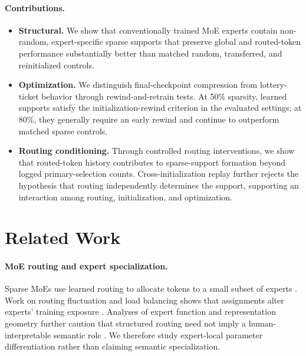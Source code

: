 \documentclass{article}
\begin{document}
\paragraph{Contributions.}
\begin{itemize}[leftmargin=*]
  \item \textbf{Structural.} We show that conventionally trained MoE experts
  contain non-random, expert-specific sparse supports that preserve global and
  routed-token performance substantially better than matched random,
  transferred, and reinitialized controls.

  \item \textbf{Optimization.} We distinguish final-checkpoint compression
  from lottery-ticket behavior through rewind-and-retrain tests. At 50\%
  sparsity, learned supports satisfy the initialization-rewind criterion in the
  evaluated settings; at 80\%, they generally require an early rewind and
  continue to outperform matched sparse controls.

  \item \textbf{Routing conditioning.} Through controlled routing
  interventions, we show that routed-token history contributes to
  sparse-support formation beyond logged primary-selection counts.
  Cross-initialization
  replay further rejects the hypothesis that routing independently determines
  the support, supporting an interaction among routing, initialization, and
  optimization.
\end{itemize}

\section{Related Work}
\label{sec:related_work}

\paragraph{MoE routing and expert specialization.}
Sparse MoEs use learned routing to allocate tokens to a small subset of experts
\citep{shazeer2017outrageouslylargeneuralnetworks,
lepikhin2020gshardscalinggiantmodels,
fedus2022switchtransformersscalingtrillion}. Work on routing fluctuation and
load balancing shows that assignments alter experts' training exposure
\citep{dai-etal-2022-stablemoe,
guo2026advancingexpertspecializationbetter}. Analyses of expert function and
representation geometry further caution that structured routing need not imply
a human-interpretable semantic role
\citep{lo2025closer,wang2026myth,tang-etal-2026-specialization}. We therefore
study expert-local parameter differentiation rather than claiming semantic
specialization.
\end{document}
